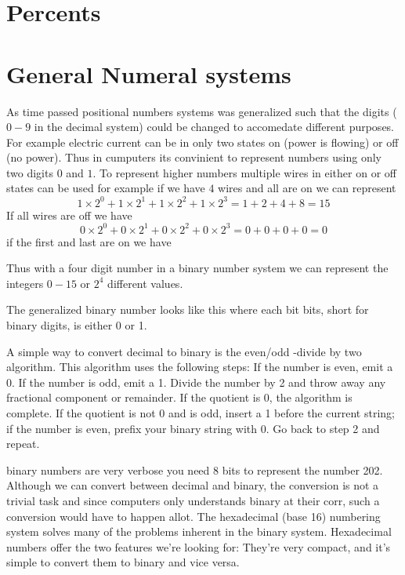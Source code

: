 \section{Percents}




\section{General Numeral systems}
As time passed positional numbers systems was generalized such that the digits ($0-9$ in the decimal system) could be changed to accomedate different purposes. For example electric current can be in only two states on (power is flowing) or off (no power). Thus in cumputers its convinient to represent numbers using only two digits $0$ and $1$. To represent higher numbers multiple wires in either on or off states can be used for example if we have $4$ wires and all are on we can represent
\[
  1 \times 2^0 + 1 \times 2^1 + 1 \times 2^2 + 1 \times 2^3 = 1 + 2 + 4 + 8 = 15
\]
If all wires are off we have
\[
  0 \times 2^0 + 0 \times 2^1 + 0 \times 2^2 + 0 \times 2^3 = 0 + 0 + 0 + 0 = 0
\]
if the first and last are on we have

Thus with a four digit number in a binary number system we can represent the integers $0-15$ or $2^4$ different values. 

The generalized binary number looks like this where each bit bits, short for binary digits, is either 0 or 1.

A simple way to convert decimal to binary is the even/odd -divide by two algorithm. This algorithm uses the following steps: If the number is even, emit a 0. If the number is odd, emit a 1. Divide the number by 2 and throw away any fractional component or remainder. If the quotient is 0, the algorithm is complete. If the quotient is not 0 and is odd, insert a 1 before the current string; if the number is even, prefix your binary string with 0. Go back to step 2 and repeat.

binary numbers are very verbose you need 8 bits to represent the number 202. Although we can convert between decimal and binary, the conversion is not a trivial task and since computers only understands binary at their corr, such a conversion would have to happen allot. The hexadecimal (base 16) numbering system solves many of the problems inherent in the binary system. Hexadecimal numbers offer the two features we're looking for: They're very compact, and it's simple to convert them to binary and vice versa. 

